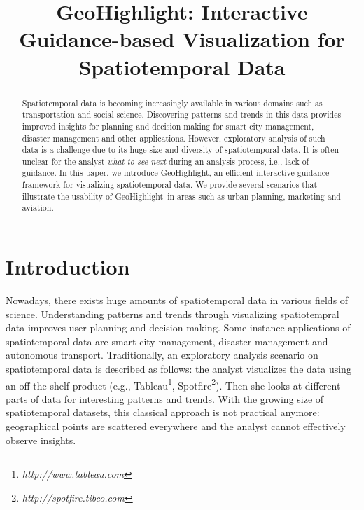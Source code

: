 \documentclass[conference]{IEEEtran}
\newcommand{\sys}{{\sc GeoHighlight}}
\begin{document}
\title{GeoHighlight: Interactive Guidance-based Visualization for Spatiotemporal Data}


\author{
\and
{}
}

\maketitle


\begin{abstract}
Spatiotemporal data is becoming increasingly available in various domains such as transportation and social science. Discovering patterns and trends in this data provides improved insights for planning and decision making for smart city management, disaster management and other applications. However, exploratory analysis of such data is a challenge due to its huge size and diversity of spatiotemporal data. It is often unclear for the analyst {\em what to see next} during an analysis process, i.e., lack of guidance. In this paper, we introduce \sys, an efficient interactive guidance framework for visualizing spatiotemporal data. We provide several scenarios that illustrate the usability of \sys\ in areas such as urban planning, marketing and aviation.
\end{abstract}

\IEEEpeerreviewmaketitle

\vspace{-5pt}
\section{Introduction} 
Nowadays, there exists huge amounts of spatiotemporal data in various fields of science. Understanding patterns and trends through visualizing spatiotempral data improves user planning and decision making. Some instance applications of spatiotemporal data are smart city management, disaster management and autonomous transport. Traditionally, an exploratory analysis scenario on spatiotemporal data is described as follows: the analyst visualizes the data using an off-the-shelf product (e.g., Tableau\footnote{\it http://www.tableau.com}, Spotfire\footnote{\it http://spotfire.tibco.com}). Then she looks at different parts of data for interesting patterns and trends. With the growing size of spatiotemporal datasets, this classical approach is not practical anymore: geographical points are scattered everywhere and the analyst cannot effectively observe insights.
\end{document}
